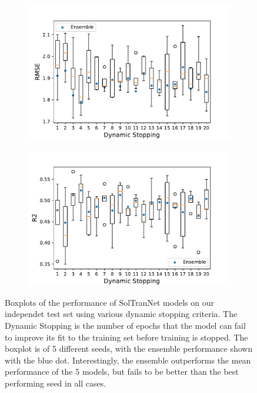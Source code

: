 \documentclass[journal=jcisd8,manuscript=article]{achemso}
\begin{document}
\begin{figure}[tb]
    \centering
    \begin{subfigure}[t]{0.48\textwidth}
        \centering
        \includegraphics[width=\linewidth]{figures/final_model_ind_dyn_RMSE.pdf}
    \end{subfigure}%
    \hfill
    \begin{subfigure}[t]{0.48\textwidth}
        \centering
        \includegraphics[width=\linewidth]{figures/final_model_ind_dyn_R2.pdf}
    \end{subfigure}
    \caption{Boxplots of the performance of SolTranNet models on our independet test set using various dynamic stopping criteria. The Dynamic Stopping is the number of epochs that the model can fail to improve its fit to the training set before training is stopped. The boxplot is of 5 different seeds, with the ensemble performance shown with the blue dot. Interestingly, the ensemble outperforms the mean performance of the 5 models, but fails to be better than the best performing seed in all cases.}
    \label{fig:dynsweep}
\end{figure}
\end{document}
